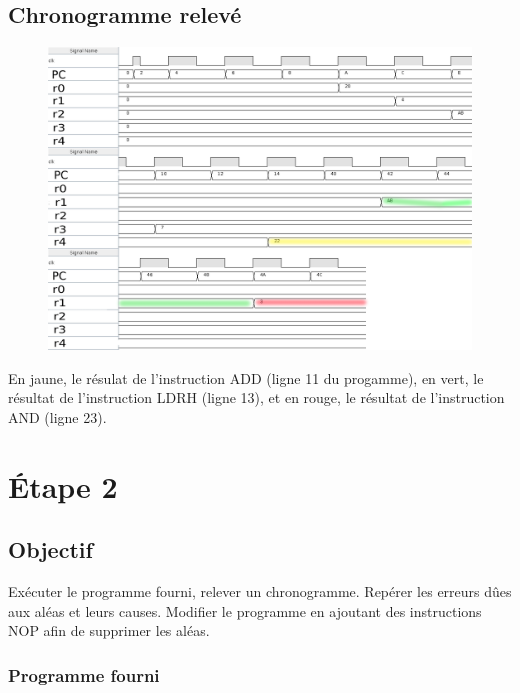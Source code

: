 \documentclass[a4paper]{article} %
\begin{document}
\subsection{Chronogramme relevé}
\begin{figure}[H]
    \centering
    \includegraphics[width=.8\textwidth]{src/CHRONO_ET1_COL2.png}
    \label{fig:chrono_et1_pic}
\end{figure}
En jaune, le résulat de l'instruction ADD (ligne 11 du progamme), en vert, le résultat de l'instruction LDRH (ligne 13), et en rouge, le résultat de l'instruction AND (ligne 23).
\section{Étape 2}
\subsection{Objectif}
Exécuter le programme fourni, relever un chronogramme. Repérer les erreurs dûes aux aléas et leurs causes. Modifier le programme en ajoutant des instructions NOP afin de supprimer les aléas.
\subsubsection{Programme fourni}

\end{document}

